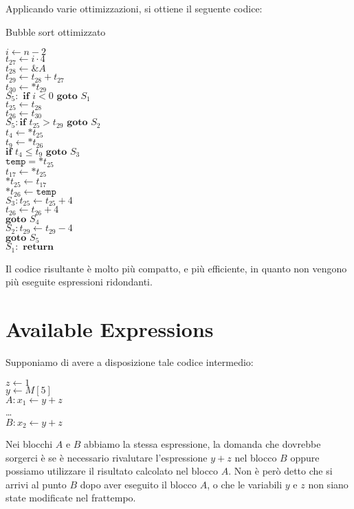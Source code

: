Applicando varie ottimizzazioni, si ottiene il seguente codice:

\begin{algorithm}[H]
    \caption{Bubble sort ottimizzato}   
    $i \gets n - 2$\\
    $t_{27} \gets i \cdot 4$ \\
    $t_{28} \gets \&A$\\
    $t_{29} \gets t_{28} + t_{27}$\\
    $t_{30} \gets *t_{29}$\\
    $S_5: \textbf{ if } i < 0 \textbf{ goto } S_1$\\
    $t_{25} \gets t_{28}$\\
    $t_{26} \gets t_{30}$\\
    $S_5: \textbf{if } t_{25} > t_{29} \textbf{ goto } S_2$\\
    $t_4 \gets *t_{25}$\\
    $t_9 \gets *t_{26}$\\
    $\textbf{if } t_4 \leq t_9 \textbf{ goto } S_3$\\
    $\texttt{temp} = *t_{25}$\\
    $t_{17} \gets *t_{25}$\\
    $*t_{25} \gets t_{17}$\\
    $*t_{26} \gets \texttt{temp}$\\
    $S_3: t_{25} \gets t_{25} + 4$\\
    $t_{26} \gets t_{26} + 4$\\
    $\textbf{goto } S_4$\\
    $S_2: t_{29} \gets t_{29} - 4$\\
    $\textbf{goto } S_5$\\
    $S_1: \textbf{ return }$\\
\end{algorithm}

Il codice risultante è molto più compatto, e più efficiente, in quanto non vengono più eseguite
espressioni ridondanti.
\section{Available Expressions}
Supponiamo di avere a disposizione tale codice intermedio:

\begin{algorithm}[H]
  $z \gets 1$\\
  $y \gets M[5]$\\
  $A: x_1 \gets y + z$\\
  \dots\\
  $B: x_2 \gets y + z$\\
\end{algorithm}
Nei blocchi $A$ e $B$ abbiamo la stessa espressione, la domanda che dovrebbe sorgerci è se è necessario
rivalutare l'espressione $y + z$ nel blocco $B$ oppure possiamo utilizzare il risultato calcolato nel blocco $A$.
Non è però detto che si arrivi al punto $B$ dopo aver eseguito il blocco $A$, o che le variabili 
$y$ e $z$ non siano state modificate nel frattempo.


